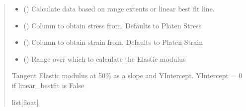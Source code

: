\documentclass[letterpaper,10pt,english]{sphinxmanual}
\begin{document}
\begin{fulllineitems}
\begin{fulllineitems}
\begin{quote}
\begin{description}
\begin{itemize}
\item {} 
\sphinxAtStartPar
{} () \textendash{} Calculate data based on range extents or linear best fit line.

\item {} 
\sphinxAtStartPar
{} () \textendash{} Column to obtain stress from. Defaults to Platen Stress

\item {} 
\sphinxAtStartPar
{} () \textendash{} Column to obtain strain from. Defaults to Platen Strain

\item {} 
\sphinxAtStartPar
{} () \textendash{} Range over which to calculate the Elastic modulus

\end{itemize}

\sphinxAtStartPar
Tangent Elastic modulus at 50\% as a slope and Y\sphinxhyphen{}Intercept. Y\sphinxhyphen{}Intercept = 0 if linear\_bestfit is False

\sphinxAtStartPar
list{[}float{]}


\end{description}
\end{quote}
\end{fulllineitems}
\end{fulllineitems}
\end{document}
